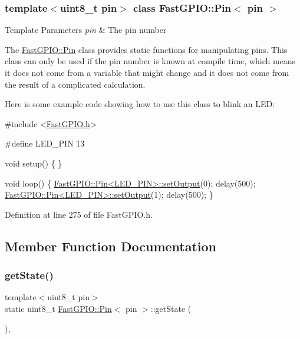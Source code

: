 \subsubsection*{template$<$uint8\+\_\+t pin$>$\newline
class Fast\+G\+P\+I\+O\+::\+Pin$<$ pin $>$}


\begin{DoxyTemplParams}{Template Parameters}
{\em pin} & The pin number\\
\hline
\end{DoxyTemplParams}
The \hyperlink{class_fast_g_p_i_o_1_1_pin}{Fast\+G\+P\+I\+O\+::\+Pin} class provides static functions for manipulating pins. This class can only be used if the pin number is known at compile time, which means it does not come from a variable that might change and it does not come from the result of a complicated calculation.

Here is some example code showing how to use this class to blink an L\+ED\+:


\begin{DoxyCode}
\textcolor{preprocessor}{#include <\hyperlink{_fast_g_p_i_o_8h}{FastGPIO.h}>}

\textcolor{preprocessor}{#define LED\_PIN 13}

\textcolor{keywordtype}{void} setup() \{
\}

\textcolor{keywordtype}{void} loop() \{
  \hyperlink{class_fast_g_p_i_o_1_1_pin_a87fb88b3ea6343db0e4a06f579a10249}{FastGPIO::Pin<LED\_PIN>::setOutput}(0);
  delay(500);
  \hyperlink{class_fast_g_p_i_o_1_1_pin_a87fb88b3ea6343db0e4a06f579a10249}{FastGPIO::Pin<LED\_PIN>::setOutput}(1);
  delay(500);
\}
\end{DoxyCode}
 

Definition at line 275 of file Fast\+G\+P\+I\+O.\+h.



\subsection{Member Function Documentation}
\mbox{\label{class_fast_g_p_i_o_1_1_pin_a79035949bafe62634210dd41486dba2c}} 
\subsubsection{\texorpdfstring{get\+State()}{getState()}}
{\footnotesize\ttfamily template$<$uint8\+\_\+t pin$>$ \\
static uint8\+\_\+t \hyperlink{class_fast_g_p_i_o_1_1_pin}{Fast\+G\+P\+I\+O\+::\+Pin}$<$ pin $>$\+::get\+State (\begin{DoxyParamCaption}{ }\end{DoxyParamCaption})\hspace{0.3cm}{\ttfamily [inline]}, {\ttfamily [static]}}



